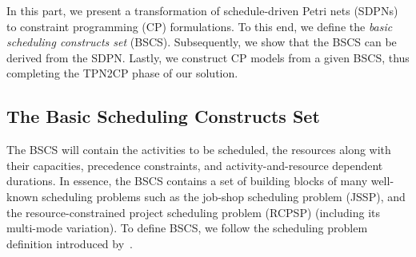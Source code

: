 \label{TPN2CP}

In this part, we present a
transformation of schedule-driven Petri nets (SDPNs)
to constraint programming (CP) formulations. To this end, we define
the \emph{basic scheduling constructs set} (BSCS). Subsequently,
we show that the BSCS can be derived from the SDPN. Lastly, we
construct CP models from a given BSCS, thus completing the TPN2CP phase of our solution.  

\subsection{The Basic Scheduling Constructs Set}
The BSCS will contain the activities to be scheduled, the resources
along with their capacities, precedence constraints, and 
activity-and-resource dependent durations. In essence, the BSCS contains a set of building blocks of  
many well-known scheduling 
problems such as the 
job-shop scheduling problem (JSSP), 
and the resource-constrained project scheduling problem (RCPSP) 
(including its multi-mode variation). To define BSCS,
we follow the scheduling problem 
definition introduced by~\cite{van1996petri}.

